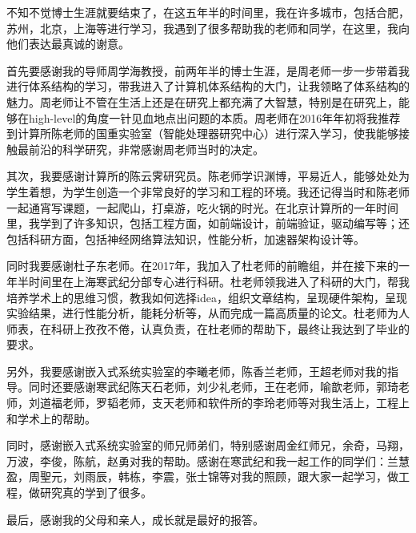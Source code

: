 \begin{acknowledgements}
不知不觉博士生涯就要结束了，在这五年半的时间里，我在许多城市，包括合肥，苏州，北京，上海等进行学习，我遇到了很多帮助我的老师和同学，在这里，我向他们表达最真诚的谢意。

首先要感谢我的导师周学海教授，前两年半的博士生涯，是周老师一步一步带着我进行体系结构的学习，带我进入了计算机体系结构的大门，让我领略了体系结构的魅力。周老师让不管在生活上还是在研究上都充满了大智慧，特别是在研究上，能够在high-level的角度一针见血地点出问题的本质。周老师在2016年年初将我推荐到计算所陈老师的国重实验室（智能处理器研究中心）进行深入学习，使我能够接触最前沿的科学研究，非常感谢周老师当时的决定。

其次，我要感谢计算所的陈云霁研究员。陈老师学识渊博，平易近人，能够处处为学生着想，为学生创造一个非常良好的学习和工程的环境。我还记得当时和陈老师一起通宵写课题，一起爬山，打桌游，吃火锅的时光。在北京计算所的一年时间里，我学到了许多知识，包括工程方面，如前端设计，前端验证，驱动编写等；还包括科研方面，包括神经网络算法知识，性能分析，加速器架构设计等。

同时我要感谢杜子东老师。在2017年，我加入了杜老师的前瞻组，并在接下来的一年半时间里在上海寒武纪分部专心进行科研。杜老师领我进入了科研的大门，帮我培养学术上的思维习惯，教我如何选择idea，组织文章结构，呈现硬件架构，呈现实验结果，进行性能分析，能耗分析等，从而完成一篇高质量的论文。杜老师为人师表，在科研上孜孜不倦，认真负责，在杜老师的帮助下，最终让我达到了毕业的要求。

另外，我要感谢嵌入式系统实验室的李曦老师，陈香兰老师，王超老师对我的指导。同时还要感谢寒武纪陈天石老师，刘少礼老师，王在老师，喻歆老师，郭琦老师，刘道福老师，罗韬老师，支天老师和软件所的李玲老师等对我生活上，工程上和学术上的帮助。

同时，感谢嵌入式系统实验室的师兄师弟们，特别感谢周金红师兄，余奇，马翔，万波，李俊，陈航，赵勇对我的帮助。感谢在寒武纪和我一起工作的同学们：兰慧盈，周聖元，刘雨辰，韩栋，李震，张士锦等对我的照顾，跟大家一起学习，做工程，做研究真的学到了很多。

最后，感谢我的父母和亲人，成长就是最好的报答。

\end{acknowledgements}
